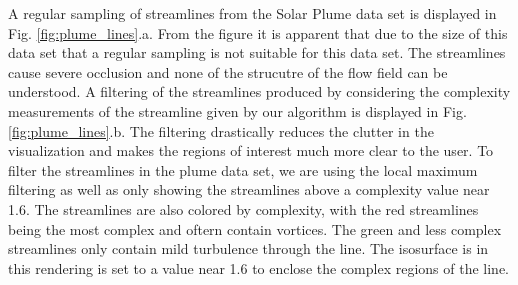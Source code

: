 \documentclass[journal]{vgtc}                %
\begin{document}
A regular sampling of streamlines from the Solar Plume data set is displayed in Fig. \ref{fig:plume_lines}.a.
From the figure it is apparent that due to the size of this data set that a regular sampling is not suitable for this data set.
The streamlines cause severe occlusion and none of the strucutre of the flow field can be understood.
A filtering of the streamlines produced by considering the complexity measurements of the streamline given by our algorithm is displayed in Fig. \ref{fig:plume_lines}.b.
The filtering drastically reduces the clutter in the visualization and makes the regions of interest much more clear to the user.
To filter the streamlines in the plume data set, we are using the local maximum filtering as well as only showing the streamlines above a complexity value near 1.6.
The streamlines are also colored by complexity, with the red streamlines being the most complex and oftern contain vortices.
The green and less complex streamlines only contain mild turbulence through the line.
The isosurface is in this rendering is set to a value near 1.6 to enclose the complex regions of the line.
\end{document}
